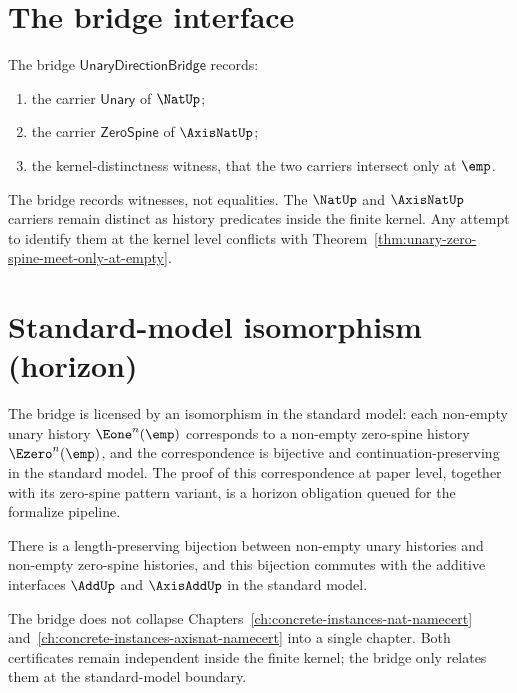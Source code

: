 \section{The bridge interface}

\begin{definition}
\label{def:unary-direction-bridge}
The bridge \(\mathsf{UnaryDirectionBridge}\) records:
\begin{enumerate}
  \item the carrier \(\mathsf{Unary}\) of \(\NatUp\);
  \item the carrier \(\mathsf{ZeroSpine}\) of \(\AxisNatUp\);
  \item the kernel-distinctness witness, that the two carriers intersect only at \(\emp\).
\end{enumerate}
\end{definition}

\begin{remark}
The bridge records witnesses, not equalities. The \(\NatUp\) and \(\AxisNatUp\) carriers remain distinct as history predicates inside the finite kernel. Any attempt to identify them at the kernel level conflicts with Theorem~\ref{thm:unary-zero-spine-meet-only-at-empty}.
\end{remark}

\section{Standard-model isomorphism (horizon)}

The bridge is licensed by an isomorphism in the standard model: each non-empty unary history \(\Eone^n(\emp)\) corresponds to a non-empty zero-spine history \(\Ezero^n(\emp)\), and the correspondence is bijective and continuation-preserving in the standard model. The proof of this correspondence at paper level, together with its zero-spine pattern variant, is a horizon obligation queued for the formalize pipeline.

\begin{theorem}
\label{thm:unary-zero-spine-standard-model-isomorphism}
There is a length-preserving bijection between non-empty unary histories and non-empty zero-spine histories, and this bijection commutes with the additive interfaces \(\AddUp\) and \(\AxisAddUp\) in the standard model.
\end{theorem}

\begin{remark}
The bridge does not collapse Chapters~\ref{ch:concrete-instances-nat-namecert} and~\ref{ch:concrete-instances-axisnat-namecert} into a single chapter. Both certificates remain independent inside the finite kernel; the bridge only relates them at the standard-model boundary.
\end{remark}
